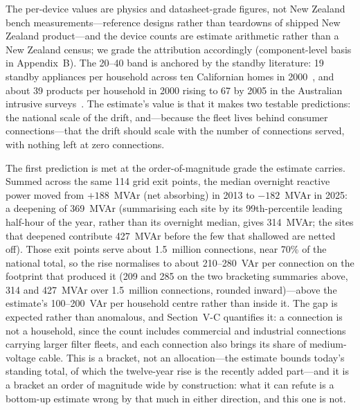 \documentclass[journal]{IEEEtran}
\begin{document}
The per-device values are physics and datasheet-grade figures, not New Zealand bench
measurements---reference designs rather than teardowns of shipped New Zealand
product---and the device counts are estimate arithmetic rather than a New
Zealand census; we grade the attribution accordingly (component-level basis in
Appendix~B). The 20--40 band is anchored by
the standby literature: 19 standby appliances per household across ten
Californian homes in 2000~\cite{ross_meier2000}, and about 39 products per
household in 2000 rising to 67 by 2005 in the Australian intrusive
surveys~\cite{edlington2006}. The estimate's value is
that it makes two testable predictions: the national scale of the drift,
and---because the fleet lives behind consumer connections---that the drift
should scale with the number of connections served, with nothing left at zero
connections.

The first prediction is met at the order-of-magnitude grade the estimate
carries. Summed across the same 114 grid exit points, the median overnight
reactive power moved from $+188$~MVAr (net absorbing) in 2013 to $-182$~MVAr in
2025: a deepening of 369~MVAr (summarising each site by its 99th-percentile
leading half-hour of the year, rather than its overnight median, gives
314~MVAr; the sites that deepened contribute 427~MVAr before the few that
shallowed are netted off). Those exit points serve about 1.5~million
connections, near 70\% of the national total, so the rise normalises to about
210--280~VAr per connection on the footprint that produced it (209 and 285 on
the two bracketing summaries above, 314 and 427~MVAr over 1.5~million
connections, rounded inward)---above the
estimate's 100--200~VAr per household centre rather than inside it. The gap is
expected rather than anomalous, and Section~V-C quantifies it: a connection is
not a household, since the count includes commercial and industrial connections
carrying larger filter fleets, and each connection also brings its share of
medium-voltage cable. This is a bracket, not an allocation---the estimate
bounds today's standing total, of which the twelve-year rise is the recently
added part---and it is a bracket an order of magnitude wide by construction:
what it can refute is a bottom-up estimate wrong by that much in either
direction, and this one is not.
\end{document}
